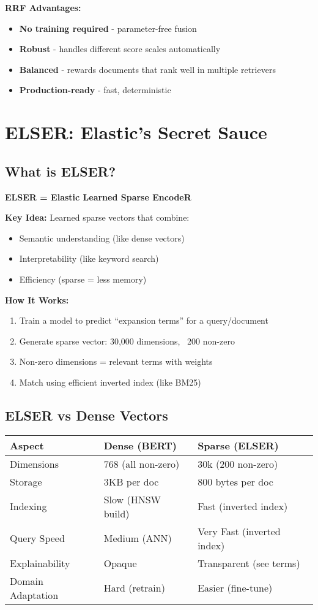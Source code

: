 \documentclass[10pt]{article}
\begin{document}
\textbf{RRF Advantages:}
\begin{itemize}
\item \textbf{No training required} - parameter-free fusion
\item \textbf{Robust} - handles different score scales automatically
\item \textbf{Balanced} - rewards documents that rank well in multiple retrievers
\item \textbf{Production-ready} - fast, deterministic
\end{itemize}

\section{ELSER: Elastic's Secret Sauce}

\subsection{What is ELSER?}

\textbf{ELSER = Elastic Learned Sparse EncodeR}

\textbf{Key Idea:} Learned sparse vectors that combine:
\begin{itemize}
\item Semantic understanding (like dense vectors)
\item Interpretability (like keyword search)
\item Efficiency (sparse = less memory)
\end{itemize}

\textbf{How It Works:}
\begin{enumerate}
\item Train a model to predict ``expansion terms'' for a query/document
\item Generate sparse vector: 30,000 dimensions, ~200 non-zero
\item Non-zero dimensions = relevant terms with weights
\item Match using efficient inverted index (like BM25)
\end{enumerate}

\subsection{ELSER vs Dense Vectors}

\begin{tabular}{|l|l|l|}
\hline
\textbf{Aspect} & \textbf{Dense (BERT)} & \textbf{Sparse (ELSER)} \\
\hline
Dimensions & 768 (all non-zero) & 30k (200 non-zero) \\
Storage & 3KB per doc & 800 bytes per doc \\
Indexing & Slow (HNSW build) & Fast (inverted index) \\
Query Speed & Medium (ANN) & Very Fast (inverted index) \\
Explainability & Opaque & Transparent (see terms) \\
Domain Adaptation & Hard (retrain) & Easier (fine-tune) \\
\hline
\end{tabular}
\end{document}
